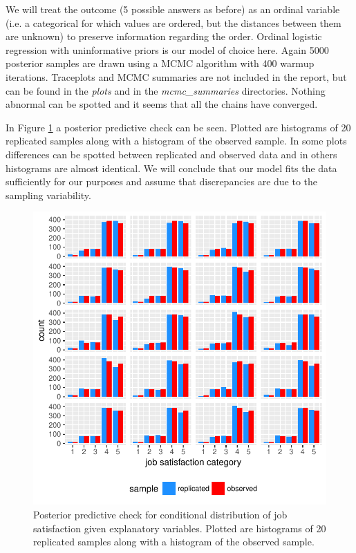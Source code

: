 \documentclass{article}
\begin{document}
We will treat the outcome (5 possible answers as before) as an ordinal variable (i.e. a categorical for which values are ordered, but the distances between them are unknown) to preserve information regarding the order. Ordinal logistic regression with uninformative priors is our model of choice here. Again 5000 posterior samples are drawn using a MCMC algorithm with 400 warmup iterations. Traceplots and MCMC summaries are not included in the report, but can be found in the \textit{plots} and in the \textit{mcmc\_summaries} directories. Nothing abnormal can be spotted and it seems that all the chains have converged.

In Figure \ref{fig_3} a posterior predictive check can be seen. Plotted are histograms of 20 replicated samples along with a histogram of the observed sample. In some plots differences can be spotted between replicated and observed data and in others histograms are almost identical. We will conclude that our model fits the data sufficiently for our purposes and assume that discrepancies are due to the sampling variability.





\begin{figure}[H]
\centering
\includegraphics{report-017}
\caption{Posterior predictive check for conditional distribution of job satisfaction given explanatory variables. Plotted are histograms of 20 replicated samples along with a histogram of the observed sample.}\label{fig_3}
\end{figure}
\end{document}
